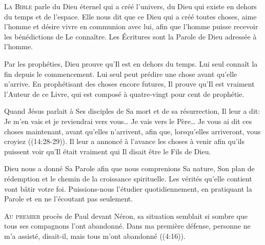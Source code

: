 \lettrine{L}{a Bible} parle du Dieu éternel qui a créé l'univers,
 du Dieu qui existe en dehors du temps et de l'espace.
 Elle nous dit que ce Dieu qui a créé toutes choses,
 aime l'homme et désire vivre en communion avec lui,
 afin que l'homme puisse recevoir les bénédictions de Le connaître.
 Les Écritures sont la Parole de Dieu adressée à l'homme.


Par les prophéties, Dieu prouve qu'Il est en dehors du temps.
 Lui seul connaît la fin depuis le commencement.
 Lui seul peut prédire une chose avant qu'elle n'arrive.
 En prophétisant des choses encore futures, Il prouve qu'Il est vraiment
 l'Auteur de ce Livre, qui est composé à quatre-vingt pour cent de prophétie. 

Quand Jésus parlait à Ses disciples de Sa mort et de sa résurrection,
 Il leur a dit: 
 \Og Je m'en vais et je reviendrai vers vous\dots{}
 Je vais vers le Père\dots{} Je vous ai dit ces choses maintenant,
 avant qu'elles n'arrivent, afin que, lorsqu'elles arriveront,
 vous croyiez \Fg{} ((14:28-29)).
 Il leur a annoncé à l'avance les choses à venir afin qu'ils puissent
 voir qu'Il était vraiment qui Il disait être \ocadr le Fils de Dieu. 

Dieu nous a donné Sa Parole afin que nous comprenions Sa nature,
 Son plan de rédemption et le chemin de la croissance spirituelle.
 Les vérités qu'elle contient vont bâtir votre foi.
 Puissions-nous l'étudier quotidiennement, en pratiquant la Parole
 et en ne l'écoutant pas seulement.

\dvrule






\lettrine{A}{u premier} procès de Paul devant Néron,
 sa situation semblait si sombre que tous ses compagnons l'ont abandonné.
 \Og Dans ma première défense, personne ne m'a assisté,
 disait-il, mais tous m'ont abandonné \Fg{}
 ((4:16)).


